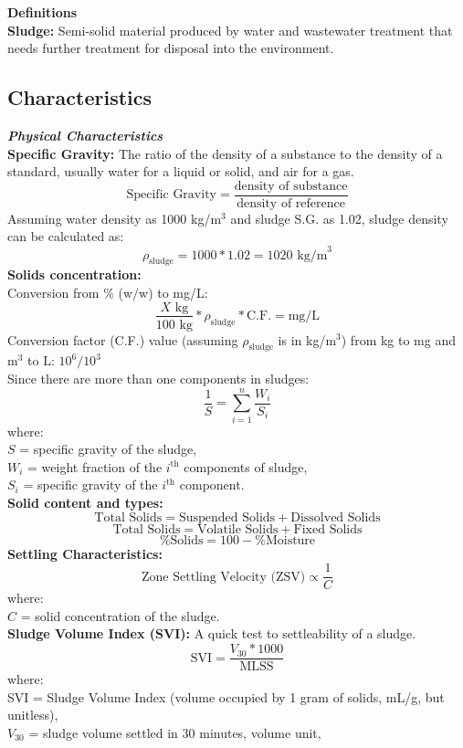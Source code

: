 \documentclass[a4paper, landscape, 8pt]{extarticle}
\begin{document}
\begin{multicols}{4}
\textbf{Definitions}\\
\textbf{Sludge:} Semi-solid material produced by water and wastewater treatment that needs further treatment for disposal into the environment.
\subsection*{Characteristics}
\textbf{\textit{Physical Characteristics}}\\
\textbf{Specific Gravity:} The ratio of the density of a substance to the density of a standard, usually water for a liquid or solid, and air for a gas.
\[
\text{Specific Gravity} = \frac{{\text{density of substance}}}{{\text{density of reference}}}
\]
Assuming water density as 1000 kg/m$^3$ and sludge S.G. as 1.02, sludge density can be calculated as:
\[
\rho_\text{sludge} = 1000 * 1.02 = 1020 \text{ kg/m}^3
\]
\textbf{Solids concentration:}\\
Conversion from \% (w/w) to mg/L:
\[
\frac{X\text{ kg}}{100\text{ kg}} * \rho_\text{sludge} * \text{C.F.} = \text{mg/L}
\]
Conversion factor (C.F.) value (assuming $\rho_\text{sludge}$ is in kg/m$^3$) from kg to mg and m$^3$ to L: $10^6/10^3$\\
Since there are more than one components in sludges:
\[
\frac{1}{S} = \sum_{i=1}^{n} \frac{W_i}{S_i}
\]
where:\\
$S$ = specific gravity of the sludge,\\
$W_i$ = weight fraction of the $i^\text{th}$ components of sludge,\\
$S_i$ = specific gravity of the $i^\text{th}$ component.\\
\textbf{Solid content and types:}
\[
\text{Total Solids} = \text{Suspended Solids} + \text{Dissolved Solids}
\]
\[
\text{Total Solids} = \text{Volatile Solids} + \text{Fixed Solids}
\]
\[
\text{\% Solids} = 100 - \text{\% Moisture}
\]
\textbf{Settling Characteristics:}
\[
\text{Zone Settling Velocity (ZSV)} \propto \frac{1}{C}
\]
where:\\
$C$ = solid concentration of the sludge.\\
\textbf{Sludge Volume Index (SVI):} A quick test to settleability of a sludge.
\[
\text{SVI} = \frac{V_{30}*1000}{\text{MLSS}}
\]
where:\\
SVI = Sludge Volume Index (volume occupied by 1 gram of solids, mL/g, but unitless),\\
$V_{30}$ = sludge volume settled in 30 minutes, volume unit,\\

\end{multicols}
\end{document}
